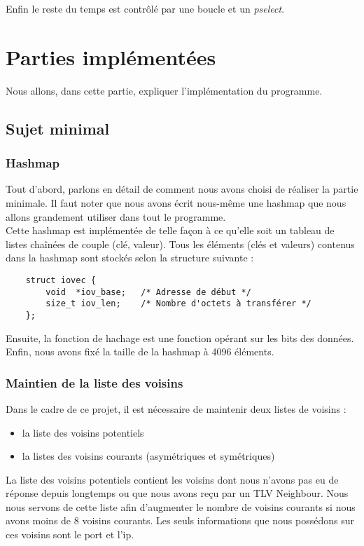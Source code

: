 \documentclass{FR16}
\begin{document}
Enfin le reste du temps est contrôlé par une boucle et un \textit{pselect}. \\

\newpage



\section{Parties implémentées}
Nous allons, dans cette partie, expliquer l'implémentation du programme.
\subsection{Sujet minimal}
\subsubsection{Hashmap}
Tout d'abord, parlons en détail de comment nous avons choisi de réaliser la partie minimale. Il faut noter que nous avons écrit nous-même une hashmap que nous allons grandement utiliser dans tout le programme.\\
Cette hashmap est implémentée de telle façon à ce qu'elle soit un tableau de listes chaînées de couple (clé, valeur). Tous les éléments (clés et valeurs) contenus dans la hashmap sont stockés selon la structure suivante :
\begin{verbatim}
    struct iovec {
        void  *iov_base;   /* Adresse de début */
        size_t iov_len;    /* Nombre d'octets à transférer */
    };
\end{verbatim}
Ensuite, la fonction de hachage est une fonction opérant sur les bits des données. Enfin, nous avons fixé la taille de la hashmap à 4096 éléments.


\subsubsection{Maintien de la liste des voisins}
Dans le cadre de ce projet, il est nécessaire de maintenir deux listes de voisins : 
\begin{itemize}
    \item la liste des voisins potentiels 
    \item la listes des voisins courants (asymétriques et symétriques)
\end{itemize}
La liste des voisins potentiels contient les voisins dont nous n'avons pas eu de réponse depuis longtemps ou que nous avons reçu par un TLV Neighbour. Nous nous servons de cette liste afin d'augmenter le nombre de voisins courants si nous avons moins de 8 voisins courants. Les seuls informations que nous possédons sur ces voisins sont le port et l'ip.\\
\end{document}
